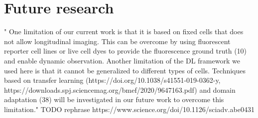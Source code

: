 \section{Future research}
"
One limitation of our current work is that it is based on fixed cells that does not allow longitudinal imaging. This can be overcome by using fluorescent reporter cell lines or live cell dyes to provide the fluorescence ground truth (10) and enable dynamic observation. Another limitation of the DL framework we used here is that it cannot be generalized to different types of cells. Techniques based on transfer learning (https://doi.org/10.1038/s41551-019-0362-y, https://downloads.spj.sciencemag.org/bmef/2020/9647163.pdf) and domain adaptation (38) will be investigated in our future work to overcome this limitation."
TODO rephrase https://www.science.org/doi/10.1126/sciadv.abe0431